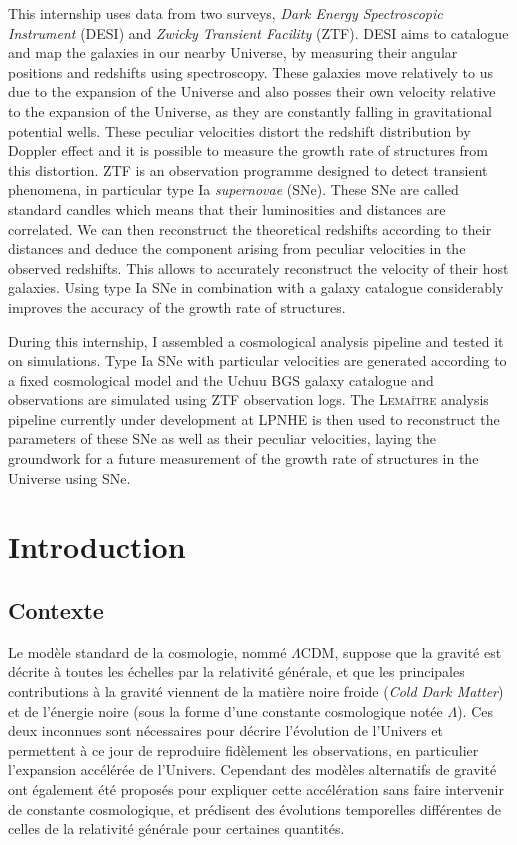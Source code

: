 \documentclass{book}
\def\lemaitre{\textsc{Lemaître}\xspace}
\begin{document}
This internship uses data from two surveys, \textit{Dark Energy Spectroscopic Instrument} (DESI) and \textit{Zwicky Transient Facility} (ZTF). DESI aims to catalogue and map the galaxies in our nearby Universe, by measuring their angular positions and redshifts using spectroscopy. These galaxies move relatively to us due to the expansion of the Universe and also posses their own velocity relative to the expansion of the Universe, as they are constantly falling in gravitational potential wells. These peculiar velocities distort the redshift distribution by Doppler effect and it is possible to measure the growth rate of structures from this distortion. ZTF is an observation programme designed to detect transient phenomena, in particular type Ia \textit{supernovae} (SNe). These SNe are called standard candles which means that their luminosities and distances are correlated. We can then reconstruct the theoretical redshifts according to their distances and deduce the component arising from peculiar velocities in the observed redshifts. This allows to accurately reconstruct the velocity of their host galaxies. Using type Ia SNe in combination with a galaxy catalogue considerably improves the accuracy of the growth rate of structures.

During this internship, I assembled a cosmological analysis pipeline and tested it on simulations. Type Ia SNe with particular velocities are generated according to a fixed cosmological model and the Uchuu BGS galaxy catalogue and observations are simulated using ZTF observation logs. The \lemaitre analysis pipeline currently under development at LPNHE is then used to reconstruct the parameters of these SNe as well as their peculiar velocities, laying the groundwork for a future measurement of the growth rate of structures in the Universe using SNe.

\chapter{Introduction}

\section{Contexte}

Le modèle standard de la cosmologie, nommé $\Lambda$CDM, suppose que la gravité est décrite à toutes les échelles par la relativité générale, et que les principales contributions à la gravité viennent de la matière noire froide (\textit{Cold Dark Matter}) et de l'énergie noire (sous la forme d'une constante cosmologique notée $\Lambda$). Ces deux inconnues sont nécessaires pour décrire l'évolution de l'Univers et permettent à ce jour de reproduire fidèlement les observations, en particulier l'expansion accélérée de l'Univers. Cependant des modèles alternatifs de gravité ont également été proposés pour expliquer cette accélération sans faire intervenir de constante cosmologique, et prédisent des évolutions temporelles différentes de celles de la relativité générale pour certaines quantités.
\end{document}
